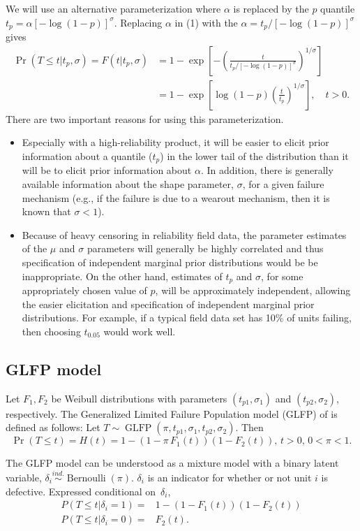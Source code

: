 \documentclass[12pt]{article}
\newcommand{\ind}{\stackrel{ind.}{\sim}}
\newcommand{\op}{\operatorname}
\begin{document}
We will use an alternative parameterization
where $\alpha$ is replaced by the $p$ quantile $t_{p}=\alpha \left
[-\log(1-p)\right ]^{\sigma}$. Replacing $\alpha$ in (1) with the
$\alpha=t_{p}/[-\log(1-p)]^{\sigma}$ gives
\begin{align*}
\nonumber
\Pr(T \leq t|t_{p},\sigma ) = F(t|t_{p},\sigma)&=1-
\exp \left [-\left (\frac{t}{t_{p}/[-\log(1-p)]^{\sigma}} \right )^{1/ \sigma}
\right ]\\
\label{equation:reparameterized.weibull.cdf}
&=1 - \exp\left[\log(1-p)\left(\frac{t}{t_{p}}\right)^{1/\sigma}\right], \quad t > 0.
\end{align*}
There are two important reasons for using this parameterization.
\begin{itemize}
\item
Especially with a high-reliability product, it will be easier to
elicit prior information about a quantile  ($t_p$) in the lower tail of the
distribution than it will be to elicit prior information about
$\alpha$. In addition, there is generally available
information about the shape parameter, $\sigma$, for a given failure
mechanism (e.g., if the failure is due to a wearout mechanism, then
it is known that $\sigma<1$). 
\item
Because of heavy censoring in reliability field data, the parameter
estimates of the $\mu$ and $\sigma$ parameters will generally be
highly correlated and thus specification of independent marginal
prior distributions would be be inappropriate. On the other hand,
estimates of $t_{p}$ and $\sigma$, for some appropriately chosen
value of $p$, will be approximately independent, allowing the easier
elicitation and specification of independent marginal prior
distributions. For example, if a typical field data set has 10\% of units
failing, then choosing $t_{0.05}$ would 
work well.
\end{itemize}

\subsection{GLFP model}
\label{subsec:GLFP model}
Let $F_1,F_2$ be Weibull distributions with parameters $(t_{p1},\sigma_1)$ and $(t_{p2}, \sigma_2)$, respectively.
The Generalized Limited Failure Population model (GLFP) of \citet{chan} is defined as follows: Let $T \sim \op{GLFP}(\pi, t_{p1},\sigma_1,t_{p2},\sigma_2)$. Then
$$\Pr(T \le t) = H(t) = 1 - (1-\pi\, F_{1}(t))(1 - F_{2}(t)),\, t>0,\, 0 < \pi < 1.$$

The GLFP model can be understood as a mixture model with a binary latent variable, $\delta_i\ind \op{Bernoulli}(\pi)$. $\delta_i$ is an indicator for whether or not unit $i$ is defective. Expressed conditional on~$\delta_i$,
\begin{align*}
P(T\le t | \delta_i=1) =& 1 -(1-F_1(t))(1-F_2(t))\\
P(T\le t | \delta_i=0) =& F_2(t).
\end{align*}
\end{document}
